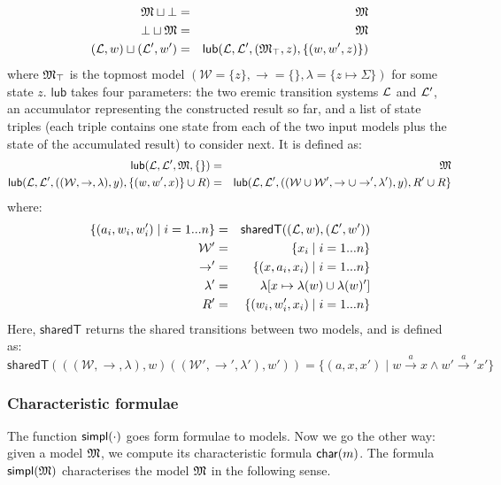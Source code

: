 \begin{eqnarray*}
\frak{M} \sqcup \bot & = & \frak{M} \\
\bot \sqcup \frak{M} & = & \frak{M} \\
(\mathcal{L},w) \sqcup (\mathcal{L}',w') & = & \mathsf{lub}(\mathcal{L}, \mathcal{L}', (\frak{M}_\top, z), \{(w, w', z)\})
\end{eqnarray*}
where $\frak{M}_\top$ is the topmost model $(\mathcal{W}=\{z\}, \rightarrow=\{\}, \lambda=\{z \mapsto \Sigma\})$ for some state $z$.
$\mathsf{lub}$ takes four parameters: the two eremic transition systems $\mathcal{L}$ and $\mathcal{L}'$, an accumulator representing the constructed result so far, and a list of state triples (each triple contains one state from each of the two input models plus the state of the accumulated result) to consider next.
It is defined as:
\begin{eqnarray*}
\mathsf{lub}(\mathcal{L}, \mathcal{L}', \frak{M}, \{\}) & = & \frak{M} \\
\mathsf{lub}(\mathcal{L}, \mathcal{L}', ((\mathcal{W}, \rightarrow, \lambda), y), \{(w,w',x)\} \cup R) & = & \mathsf{lub}(\mathcal{L}, \mathcal{L}', ((\mathcal{W} \cup \mathcal{W}', \rightarrow \cup \rightarrow', \lambda'), y), R' \cup R\}
\end{eqnarray*}
where:
\begin{eqnarray*}
\{(a_i, w_i, w'_i) \;|\; i = 1 ... n\} & = & \mathsf{sharedT}((\mathcal{L},w), (\mathcal{L}',w')) \\
\mathcal{W}' & = & \{x_i \;|\; i = 1 ... n\} \\
\rightarrow' & = & \{(x, a_i, x_i) \;|\; i = 1 ... n\} \\
\lambda' & = & \lambda [x \mapsto \lambda(w) \cup \lambda(w)'] \\
R' & = & \{(w_i, w'_i, x_i) \;|\; i = 1 ... n\}
\end{eqnarray*}
Here, $\mathsf{sharedT}$ returns the shared transitions between two models, and is defined as:
\[
\mathsf{sharedT}(((\mathcal{W}, \rightarrow, \lambda),w) ((\mathcal{W}', \rightarrow', \lambda'),w')) =  \{(a, x, x') \;|\; w \xrightarrow{a} x \land w' \xrightarrow{a}' x'\}
\]

\subsubsection{Characteristic formulae}

The function $\mathsf{simpl}(\cdot)$ goes form formulae to models. Now we go
the other way: given a model $\frak{M}$, we compute its characteristic
formula $\mathsf{char}(m)$. The formula $\mathsf{simpl}(\frak{M})$ characterises the model
$\frak{M}$ in the following sense. 

